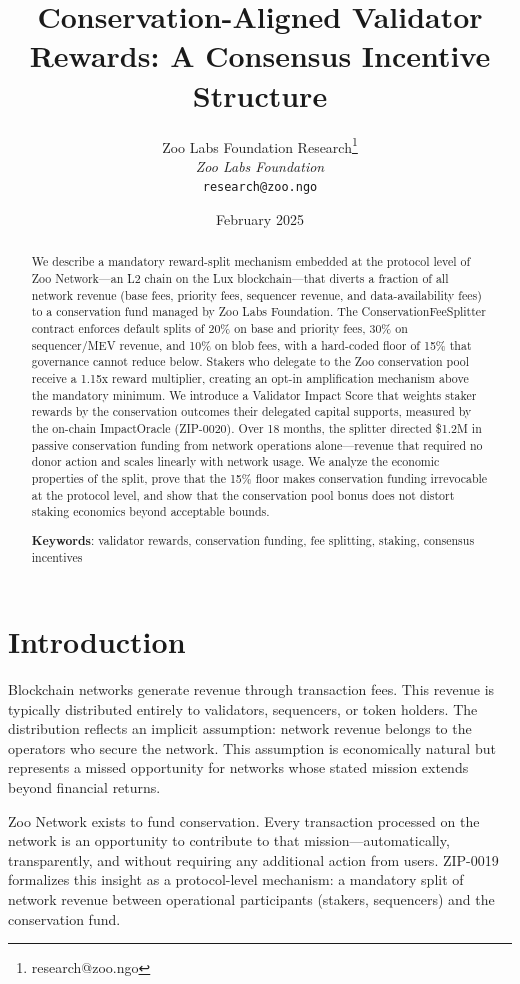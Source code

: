 \documentclass[11pt,letterpaper]{article}
\title{\textbf{Conservation-Aligned Validator Rewards: A Consensus Incentive Structure}}
\author{
Zoo Labs Foundation Research\thanks{research@zoo.ngo}\\
\textit{Zoo Labs Foundation}\\
\texttt{research@zoo.ngo}
}
\date{February 2025}
\begin{document}
\zoocoverpage

\begin{abstract}
We describe a mandatory reward-split mechanism embedded at the protocol level of Zoo Network---an L2 chain on the Lux blockchain---that diverts a fraction of all network revenue (base fees, priority fees, sequencer revenue, and data-availability fees) to a conservation fund managed by Zoo Labs Foundation. The ConservationFeeSplitter contract enforces default splits of 20\% on base and priority fees, 30\% on sequencer/MEV revenue, and 10\% on blob fees, with a hard-coded floor of 15\% that governance cannot reduce below. Stakers who delegate to the Zoo conservation pool receive a 1.15x reward multiplier, creating an opt-in amplification mechanism above the mandatory minimum. We introduce a Validator Impact Score that weights staker rewards by the conservation outcomes their delegated capital supports, measured by the on-chain ImpactOracle (ZIP-0020). Over 18 months, the splitter directed \$1.2M in passive conservation funding from network operations alone---revenue that required no donor action and scales linearly with network usage. We analyze the economic properties of the split, prove that the 15\% floor makes conservation funding irrevocable at the protocol level, and show that the conservation pool bonus does not distort staking economics beyond acceptable bounds.

\textbf{Keywords}: validator rewards, conservation funding, fee splitting, staking, consensus incentives
\end{abstract}

\section{Introduction}

Blockchain networks generate revenue through transaction fees. This revenue is typically distributed entirely to validators, sequencers, or token holders. The distribution reflects an implicit assumption: network revenue belongs to the operators who secure the network. This assumption is economically natural but represents a missed opportunity for networks whose stated mission extends beyond financial returns.

Zoo Network exists to fund conservation. Every transaction processed on the network is an opportunity to contribute to that mission---automatically, transparently, and without requiring any additional action from users. ZIP-0019 formalizes this insight as a protocol-level mechanism: a mandatory split of network revenue between operational participants (stakers, sequencers) and the conservation fund.
\end{document}
